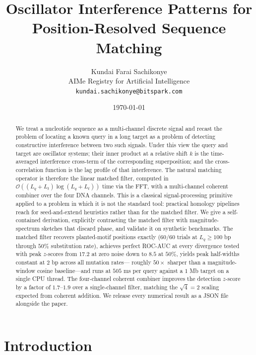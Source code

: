 \documentclass[twocolumn,11pt,a4paper]{article}
\title{\textbf{Oscillator Interference Patterns for\\ Position-Resolved Sequence Matching}}
\author{
Kundai Farai Sachikonye\\[0.2em]
AIMe Registry for Artificial Intelligence\\[0.2em]
\texttt{kundai.sachikonye@bitspark.com}
}
\date{\today}
\theoremstyle{definition}
\theoremstyle{remark}
\newcommand{\bigO}{\mathcal{O}}
\begin{document}
\maketitle

\begin{abstract}
\noindent
We treat a nucleotide sequence as a multi-channel discrete signal and
recast the problem of locating a known query in a long target as a
problem of detecting constructive interference between two such signals.
Under this view the query and target are oscillator systems; their
inner product at a relative shift $k$ is the time-averaged interference
cross-term of the corresponding superposition; and the cross-correlation
function is the lag profile of that interference. The natural matching
operator is therefore the linear matched filter, computed in
$\bigO((L_q + L_t) \log(L_q + L_t))$ time via the FFT, with a
multi-channel coherent combiner over the four DNA channels. This is a
classical signal-processing primitive applied to a problem in which it is
not the standard tool: practical homology pipelines reach for
seed-and-extend heuristics rather than for the matched filter.
We give a self-contained derivation, explicitly contrasting the matched
filter with magnitude-spectrum sketches that discard phase, and validate
it on synthetic benchmarks. The matched filter recovers planted-motif
positions exactly ($60/60$ trials at $L_q \geq 100$ bp through $50\%$
substitution rate), achieves perfect ROC-AUC at every divergence tested
with peak $z$-scores from $17.2$ at zero noise down to $8.5$ at $50\%$,
yields peak half-widths constant at $2$ bp across all mutation rates---
roughly $50\times$ sharper than a magnitude-window cosine baseline---and
runs at $505$ ms per query against a $1$ Mb target on a single CPU
thread. The four-channel coherent combiner improves the detection
$z$-score by a factor of $1.7$--$1.9$ over a single-channel filter,
matching the $\sqrt{4} = 2$ scaling expected from coherent addition.
We release every numerical result as a JSON file alongside the paper.
\end{abstract}

\tableofcontents

\section{Introduction}
\label{sec:intro}
\end{document}
